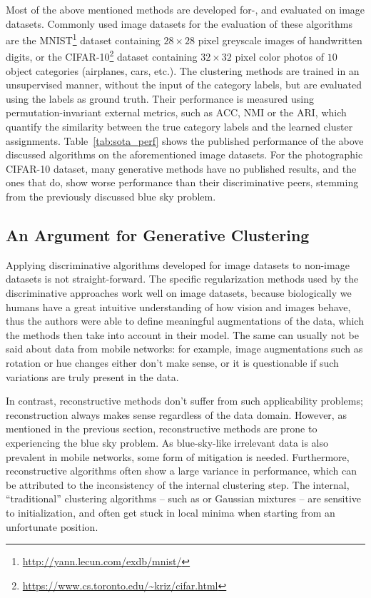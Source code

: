 			Most of the above mentioned methods are developed for\nobreakdash-, and evaluated on image datasets.
			Commonly used image datasets for the evaluation of these algorithms are the MNIST\footnote{\url{http://yann.lecun.com/exdb/mnist/}} dataset containing $28\times28$ pixel greyscale images of handwritten digits, or the CIFAR-10\footnote{\url{https://www.cs.toronto.edu/~kriz/cifar.html}} dataset containing $32\times32$ pixel color photos of $10$ object categories (airplanes, cars, etc.).
			The clustering methods are trained in an unsupervised manner, without the input of the category labels, but are evaluated using the labels as ground truth.
			Their performance is measured using permutation-invariant external metrics, such as \ac{ACC}, \ac{NMI} or the \ac{ARI}, which quantify the similarity between the true category labels and the learned cluster assignments.
			Table~\ref{tab:sota_perf} shows the published performance of the above discussed algorithms on the aforementioned image datasets.
			For the photographic CIFAR-10 dataset, many generative methods have no published results, and the ones that do, show worse performance than their discriminative peers, stemming from the previously discussed blue sky problem.
			
		\subsection{An Argument for Generative Clustering}
			\label{cha:decorr_ae:sec:gen_clust_arg}
			
			Applying discriminative algorithms developed for image datasets to non-image datasets is not straight-forward.
			The specific regularization methods used by the discriminative approaches work well on image datasets, because biologically we humans have a great intuitive understanding of how vision and images behave, thus the authors were able to define meaningful augmentations of the data, which the methods then take into account in their model.
			The same can usually not be said about data from mobile networks: for example, image augmentations such as rotation or hue changes either don't make sense, or it is questionable if such variations are truly present in the data.
			
			In contrast, reconstructive methods don't suffer from such applicability problems; reconstruction always makes sense regardless of the data domain.		
			However, as mentioned in the previous section, reconstructive methods are prone to experiencing the blue sky problem.
			As blue-sky-like irrelevant data is also prevalent in mobile networks, some form of mitigation is needed.		
			Furthermore, reconstructive algorithms often show a large variance in performance, which can be attributed to the inconsistency of the internal clustering step.		
			The internal, ``traditional'' clustering algorithms -- such as \kmeans{} or Gaussian mixtures \cite{gmm} -- are sensitive to initialization, and often get stuck in local minima when starting from an unfortunate position.	
			
